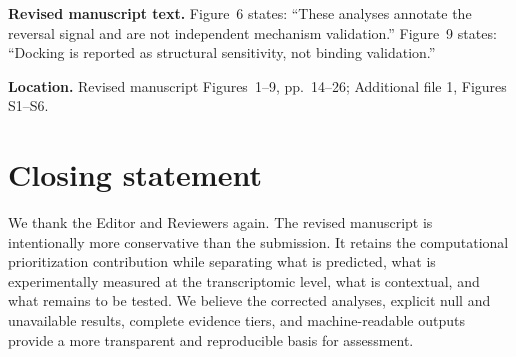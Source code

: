 \documentclass[10pt]{article}
\newcommand{\RevisedText}{\textbf{Revised manuscript text.} }
\newcommand{\Location}{\textbf{Location.} }
\newcommand{\qtext}[1]{``#1''}
\begin{document}
\RevisedText Figure~6 states: \qtext{These analyses annotate the reversal signal and are not independent mechanism validation.} Figure~9 states: \qtext{Docking is reported as structural sensitivity, not binding validation.}

\Location Revised manuscript Figures~1--9, pp.~14--26; Additional file 1, Figures S1--S6.

\section*{Closing statement}

We thank the Editor and Reviewers again. The revised manuscript is intentionally more conservative than the submission. It retains the computational prioritization contribution while separating what is predicted, what is experimentally measured at the transcriptomic level, what is contextual, and what remains to be tested. We believe the corrected analyses, explicit null and unavailable results, complete evidence tiers, and machine-readable outputs provide a more transparent and reproducible basis for assessment.
\end{document}
